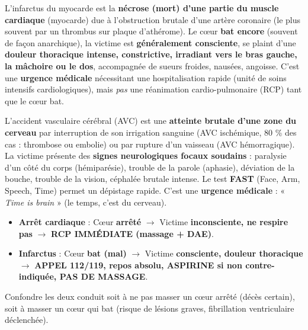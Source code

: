 \documentclass[11pt]{article}
\newcommand{\cle}[1]{{\popxbold\color{popdark}#1}}
\begin{document}
\begin{definition}
L'\cle{infarctus du myocarde} est la \textbf{nécrose (mort) d'une partie du muscle cardiaque} (myocarde) due à l'obstruction brutale d'une artère coronaire (le plus souvent par un thrombus sur plaque d'athérome). Le cœur \textbf{bat encore} (souvent de façon anarchique), la victime est \textbf{généralement consciente}, se plaint d'une \textbf{douleur thoracique intense, constrictive, irradiant vers le bras gauche, la mâchoire ou le dos}, accompagnée de sueurs froides, nausées, angoisse. C'est une \textbf{urgence médicale} nécessitant une hospitalisation rapide (unité de soins intensifs cardiologiques), mais \emph{pas} une réanimation cardio-pulmonaire (RCP) tant que le cœur bat.
\end{definition}

\begin{definition}
L'\cle{accident vasculaire cérébral} (AVC) est une \textbf{atteinte brutale d'une zone du cerveau} par interruption de son irrigation sanguine (AVC ischémique, 80 \% des cas : thrombose ou embolie) ou par rupture d'un vaisseau (AVC hémorragique). La victime présente des \textbf{signes neurologiques focaux soudains} : paralysie d'un côté du corps (hémiparésie), trouble de la parole (aphasie), déviation de la bouche, trouble de la vision, céphalée brutale intense. Le test \textbf{FAST} (Face, Arm, Speech, Time) permet un dépistage rapide. C'est une \textbf{urgence médicale} : « \emph{Time is brain} » (le temps, c'est du cerveau).
\end{definition}

\begin{attention}
\begin{itemize}
    \item \textbf{Arrêt cardiaque} : Cœur \textbf{arrêté} $\rightarrow$ Victime \textbf{inconsciente, ne respire pas} $\rightarrow$ \textbf{RCP IMMÉDIATE (massage + DAE)}.
    \item \textbf{Infarctus} : Cœur \textbf{bat (mal)} $\rightarrow$ Victime \textbf{consciente, douleur thoracique} $\rightarrow$ \textbf{APPEL 112/119, repos absolu, ASPIRINE si non contre-indiquée, PAS DE MASSAGE}.
\end{itemize}
Confondre les deux conduit soit à ne pas masser un cœur arrêté (décès certain), soit à masser un cœur qui bat (risque de lésions graves, fibrillation ventriculaire déclenchée).
\end{attention}
\end{document}
